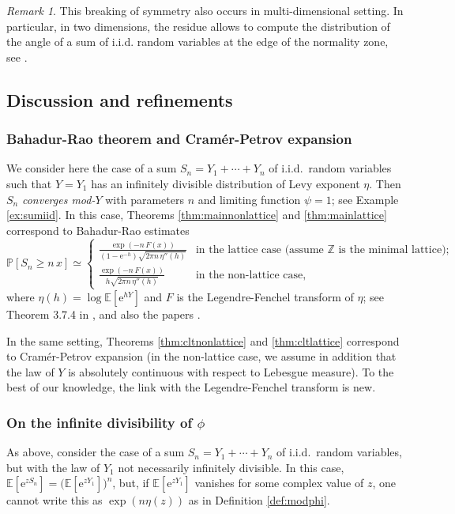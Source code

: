 \documentclass[12pt,a4paper,reqno]{amsart}
\theoremstyle{remark}
\newtheorem{remark}[lemma]{Remark}
\newcommand{\Z}{\mathbb{Z}}
\newcommand{\E}{\mathrm{e}}
\newcommand{\esper}{\mathbb{E}}
\newcommand{\proba}{\mathbb{P}}
\begin{document}
\begin{remark}
This breaking of symmetry also occurs in multi-dimensional setting. In particular, in two dimensions, the residue allows to compute the distribution of the angle
of a sum of i.i.d. random variables at the edge of the normality zone, see \cite{Multidim}.
\end{remark}
\bigskip
\bigskip

\subsection{Discussion and refinements}

\subsubsection{Bahadur-Rao theorem and Cramér-Petrov expansion}
We consider here the case of a sum $S_n=Y_1+\cdots+Y_n$ of i.i.d.~random variables
such that $Y=Y_1$ has an infinitely divisible distribution of Levy exponent $\eta$.
Then $S_n$ {\em converges mod-$Y$} with parameters $n$ and limiting function $\psi=1$;
see Example \ref{ex:sumiid}. In this case, Theorems \ref{thm:mainnonlattice} and \ref{thm:mainlattice}
correspond to Bahadur-Rao estimates   
$$\proba[S_n \geq n\,x] \simeq \begin{cases}\frac{\exp(-n\,F(x))}{(1-\E^{-h})\sqrt{2\pi n \,\eta''(h)}}
    &\!\!\!\text{in the lattice case (assume $\Z$ is the minimal lattice);} \\
\frac{\exp(-n\,F(x))}{h\sqrt{2\pi n \,\eta''(h)}}&\!\!\!\text{in the non-lattice case,}
 \end{cases}
$$
where $\eta(h)=\log \esper[\E^{hY}]$ and $F$ is the Legendre-Fenchel transform of $\eta$;
see Theorem 3.7.4 in \cite{DZ98}, and also the papers \cite{BR60,Ney83,Ilt95}.
\medskip

In the same setting,
 Theorems \ref{thm:cltnonlattice} and \ref{thm:cltlattice} correspond to 
 Cramér-Petrov expansion \cite{Petrov95} (in the non-lattice case,
 we assume in addition that the law of $Y$ is absolutely continuous with respect to Lebesgue measure).
 To the best of our knowledge, the link with the Legendre-Fenchel transform is new.\smallskip
\medskip


\subsubsection{On the infinite divisibility of $\phi$}
\label{subsect:OnInfDiv}
As above, consider the case of a sum $S_n=Y_1+\cdots+Y_n$ of i.i.d.~random variables,
but with the law of $Y_1$ not necessarily infinitely divisible.
In this case, $\esper[\E^{zS_n}]=\big(\esper[\E^{zY_1}] \big)^n$, 
but, if $\esper[\E^{zY_1}]$ vanishes for some complex value of $z$,
one cannot write this as $\exp(n \eta(z))$ as in Definition \ref{def:modphi}.
\end{document}
